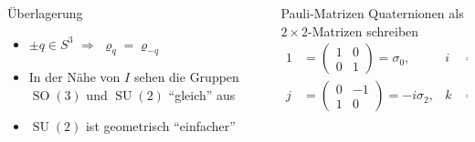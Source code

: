 \begin{frame}[t]
\begin{columns}[t,onlytextwidth]
\begin{column}{0.38\textwidth}
{\begin{block}{Überlagerung}
\begin{center}
\begin{tikzpicture}[>=latex,thick]
\end{tikzpicture}
\end{center}
\begin{itemize}
\item<7->
$\pm q\in S^3$ $\Rightarrow$ $\varrho_{q}=\varrho_{-q}$
\item<8->
In der Nähe von $I$ sehen die Gruppen
$\operatorname{SO}(3)$
und
$\operatorname{SU}(2)$ 
``gleich'' aus
\item<9->
$\operatorname{SU}(2)$ ist geometrisch ``einfacher''
\end{itemize}
\end{block}}
\end{column}
\begin{column}{0.58\textwidth}
\begin{block}{Pauli-Matrizen}
Quaternionen als $2\times 2$-Matrizen schreiben
\begin{align*}
1&=\begin{pmatrix}1&0\\0&1\end{pmatrix}=\sigma_0,
&
i&=\begin{pmatrix}0&i\\i&0\end{pmatrix}=-i\sigma_1
\\
j&=\begin{pmatrix}0&-1\\1&0\end{pmatrix}=-i\sigma_2,
&
k&=\begin{pmatrix}i&0\\0&-i\end{pmatrix}=-i\sigma_3
\end{align*}
\end{block}
\end{column}
\end{columns}
\end{frame}
\egroup
